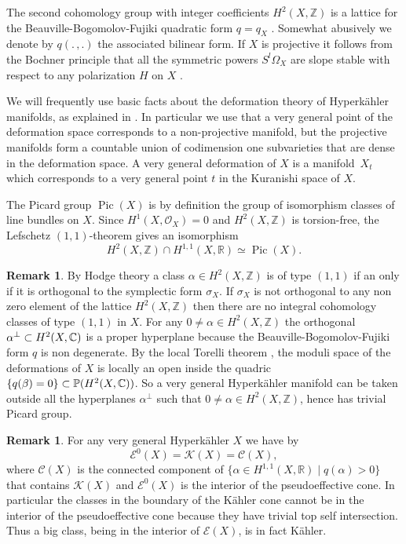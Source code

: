 \documentclass[11pt]{article}
\let\mathcal\mathscr
\theoremstyle{plain}
\theoremstyle{definition}
\newtheorem{remark}[theorem]{Remark}
\newcommand{\R}{\ensuremath{\mathbb{R}}}
\newcommand{\Z}{\ensuremath{\mathbb{Z}}}
\newcommand{\PP}{\ensuremath{\mathbb{P}}}
\newcommand\sO{{\mathcal O}}
\DeclareMathOperator{\pic}{Pic}
\begin{document}
The second cohomology group with integer coefficients $H^2(X,\Z)$
is a lattice for the Beauville-Bogomolov-Fujiki quadratic form $q=q_X$ \cite[\S 8]{Bea83}. Somewhat abusively we denote by
$q(. \,, .)$ the associated bilinear form.
If $X$ is projective it follows from the Bochner principle that all the symmetric powers $S^l \Omega_X$ are slope stable
with respect to any polarization $H$ on $X$ \cite[Th.\,6]{Kob80}.

We will frequently use basic facts about the deformation theory of Hyperkähler manifolds, as explained in
\cite[\S 8]{Bea83} \cite[\S 1]{Huy99}. In particular we use that a very general point of the deformation
space corresponds to a non-projective manifold, but the projective manifolds form a countable union of codimension
one subvarieties that are dense in the deformation space. A very general deformation of $X$ is a manifold~$X_t$ which corresponds to a very general point $t$ in the Kuranishi space of $X$.

The Picard group $\pic (X)$ is by definition the group of isomorphism classes of line bundles on $X$.
Since $H^1(X, \sO_X)=0$ and $H^2(X, \Z)$ is torsion-free,
the Lefschetz $(1,1)$-theorem \cite[Prop.\,3.3.2]{Huy05} gives an isomorphism
\[
H^2(X, \Z) \cap H^{1,1}(X, \R) \simeq \pic (X).
\]

\begin{remark} \label{remarknosubvarieties}
By Hodge theory a class $\alpha \in H^2(X, \Z )$ is of type $(1,1)$ if an only if it is orthogonal to the symplectic form $\sigma_X$. If $\sigma_X$ is not orthogonal to any non zero element of the lattice $H^2(X, \Z )$ then there are no integral cohomology classes of type $(1,1)$ in $X$.
For any $0\neq \alpha \in H^2(X, \Z )$ the orthogonal $\alpha^\bot \subset H^2(X, \mathbb{C} )$ is a proper hyperplane because the Beauville-Bogomolov-Fujiki form $q$ is non degenerate. By the local Torelli theorem \cite[Th.\,5]{Bea83}, the moduli space of the deformations of $X$ is locally an open inside the quadric $\{ q(\beta)=0\} \subset \PP (H^2(X,\C))$. So a very general Hyperkähler manifold can be taken outside all the hyperplanes $\alpha^\bot $ such that $0\neq \alpha \in H^2(X, \Z)$, hence has trivial Picard group.
\end{remark}

\begin{remark} \label{remarkEgeneral}
For any very general Hyperkähler $X$ we have by \cite[Cor.\,1]{Huy03}
\[
\mathcal{E}^0(X)=\mathcal{K}(X) = \mathcal C (X),
\]
where $\mathcal C (X)$ is the connected component of $\{ \alpha \in H^{1,1}(X, \R) \mid q(\alpha)>0 \}$
that contains $\mathcal{K}(X)$ and $\mathcal{E}^0(X)$ is the interior of the pseudoeffective cone.
In particular the classes in the boundary of the Kähler cone cannot be in the interior of the pseudoeffective cone because they have trivial top self intersection. Thus a big class, being in the interior of $\mathcal E(X)$,
is in fact Kähler.
\end{remark}
\end{document}
